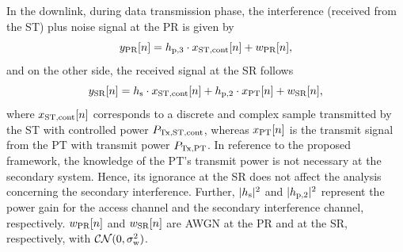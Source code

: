 In the downlink, during data transmission phase, the interference (received from the ST) plus noise signal at the PR is given by
\begin{equation}
y_{\text{PR}}[n] = h_{\text{p,3}}  \cdot x_{\text{ST,cont}}[n] + w_{\text{PR}}[n],
\label{eq_US:sys_mod_pr}
\end{equation}
and on the other side, the received signal at the SR follows 
\begin{equation}
y_{\text{SR}}[n] = h_{\text{s}} \cdot x_{\text{ST,cont}}[n] + h_{\text{p,2}} \cdot x_{\text{PT}}[n] + w_{\text{SR}}[n],
\label{eq_US:sys_mod_sr}
\end{equation}
where $x_{\text{ST,cont}}[n]$ corresponds to a discrete and complex sample transmitted by the ST with controlled power $P_{\text{Tx,ST,cont}}$, whereas $x_{\text{PT}}[n]$ is the transmit signal from the PT with transmit power $P_{\text{Tx,PT}}$. In reference to the proposed framework, the knowledge of the PT's transmit power is not necessary at the secondary system. Hence, its ignorance at the SR does not affect the analysis concerning the secondary interference. Further, $|h_{\text{s}}|^2$ and $|h_{\text{p,2}}|^2$ represent the power gain for the access channel and the secondary interference channel, respectively. $w_{\text{PR}}[n]$ and $w_{\text{SR}}[n]$ are AWGN at the PR and at the SR, respectively, with $\mathcal{CN}(0, \sigma^2_{\text{w}})$.%


